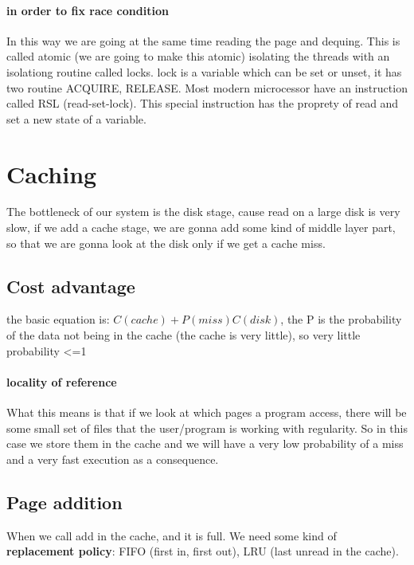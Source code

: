 \documentclass{article}
\begin{document}
      \paragraph{in order to fix race condition}
        In this way we are going at the same time reading the page and dequing. This is called
        atomic (we are going to make this atomic) isolating the threads with an isolationg 
        routine called locks. lock is a variable which can be set or unset, it has two routine
        ACQUIRE, RELEASE. Most modern microcessor have an instruction called RSL (read-set-lock).
        This special instruction has the proprety of read and set a new state of a variable.
  \section{Caching}
    The bottleneck of our system is the disk stage, cause read on a large disk is very slow, 
    if we add a cache stage, we are gonna add some kind of middle layer part, so that we are
    gonna look at the disk only if we get a cache miss. 
    \subsection{Cost advantage}
      the basic equation is: $C(cache) + P(miss)C(disk)$, the P is the probability of the 
      data not being in the cache (the cache is very little), so very little probability <=1%
      \paragraph{locality of reference} What this means is that if we look at which pages 
        a program access, there will be some small set of files that the user/program is 
        working with regularity. So in this case we store them in the cache and we will have 
        a very low probability of a miss and a very fast execution as a consequence.
    \subsection{Page addition}
      When we call add in the cache, and it is full. We need some kind of \textbf{replacement
      policy}: FIFO (first in, first out), LRU (last unread in the cache).
\end{document}
